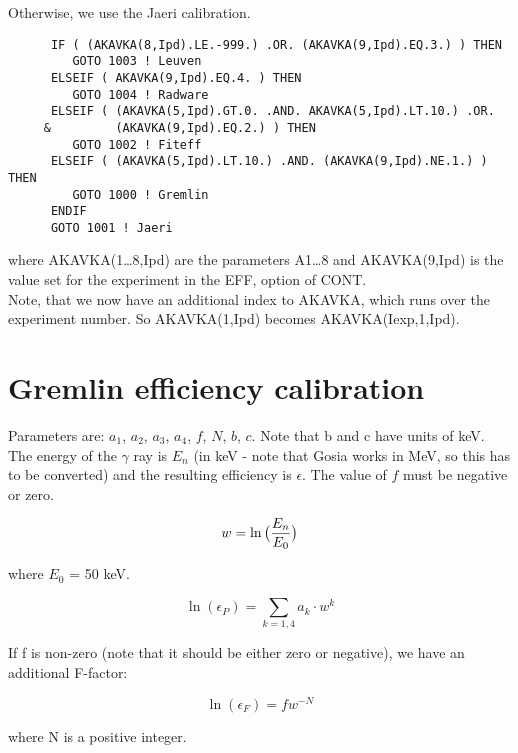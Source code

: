 Otherwise, we use the Jaeri calibration.

\begin{verbatim}
      IF ( (AKAVKA(8,Ipd).LE.-999.) .OR. (AKAVKA(9,Ipd).EQ.3.) ) THEN
         GOTO 1003 ! Leuven
      ELSEIF ( AKAVKA(9,Ipd).EQ.4. ) THEN
         GOTO 1004 ! Radware
      ELSEIF ( (AKAVKA(5,Ipd).GT.0. .AND. AKAVKA(5,Ipd).LT.10.) .OR. 
     &         (AKAVKA(9,Ipd).EQ.2.) ) THEN
         GOTO 1002 ! Fiteff
      ELSEIF ( (AKAVKA(5,Ipd).LT.10.) .AND. (AKAVKA(9,Ipd).NE.1.) ) THEN
         GOTO 1000 ! Gremlin
      ENDIF
      GOTO 1001 ! Jaeri
\end{verbatim}

where AKAVKA(1{\ldots}8,Ipd) are the parameters A1{\ldots}8 and
AKAVKA(9,Ipd) is the value set for the experiment in the EFF, option
of CONT.\\

Note, that we now have an additional index to AKAVKA, which runs over
the experiment number. So AKAVKA(1,Ipd) becomes AKAVKA(Iexp,1,Ipd). 

\section{Gremlin efficiency calibration}

Parameters are: $a_1$, $a_2$, $a_3$, $a_4$, $f$, $N$, $b$, $c$. Note that b
and c have units of keV. The energy of the $\gamma$ ray is $E_n$ (in keV -
note that Gosia works in MeV, so this has to be converted) and the resulting
efficiency is $\epsilon$. The value of $f$ must be negative or zero.

\begin{equation}
w = \ln\big({E_n \over E_0}\big)
\end{equation}

where $E_0$ = 50 keV.

\begin{equation}
\ln(\epsilon_P) = \sum_{k=1,4} a_k \cdot w^k
\end{equation}

If f is non-zero (note that it should be either zero or negative), we have
an additional F-factor:

\begin{equation}
\ln(\epsilon_F) = f w^{-N}
\end{equation}

where N is a positive integer.\\


